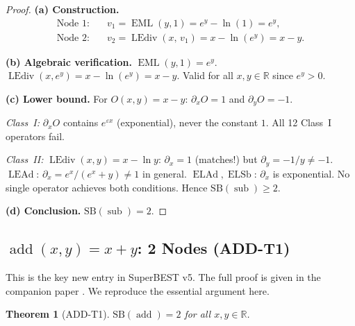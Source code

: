 \documentclass[12pt,a4paper]{article}
\newtheorem{theorem}{Theorem}[section]
\theoremstyle{definition}
\newcommand{\EML}{\operatorname{EML}}
\newcommand{\ELAd}{\operatorname{ELAd}}
\newcommand{\ELSb}{\operatorname{ELSb}}
\newcommand{\LEAd}{\operatorname{LEAd}}
\newcommand{\LEdiv}{\operatorname{LEdiv}}
\newcommand{\subop}{\operatorname{sub}}
\newcommand{\addop}{\operatorname{add}}
\newcommand{\SB}{\mathrm{SB}}
\newcommand{\R}{\mathbb{R}}
\begin{document}
\begin{proof}
\textbf{(a) Construction.}
\begin{align*}
  \text{Node 1:} &\quad v_1 = \EML(y,1) = e^y - \ln(1) = e^y, \\
  \text{Node 2:} &\quad v_2 = \LEdiv(x,\,v_1) = x - \ln(e^y) = x - y.
\end{align*}

\textbf{(b) Algebraic verification.}
$\EML(y,1) = e^y$.  $\LEdiv(x, e^y) = x - \ln(e^y) = x - y$.
Valid for all $x, y \in \R$ since $e^y > 0$.

\textbf{(c) Lower bound.}
For $O(x,y) = x-y$: $\partial_x O = 1$ and $\partial_y O = -1$.

\emph{Class~I:} $\partial_x O$ contains $e^{\varepsilon x}$ (exponential), never the
constant $1$.  All 12 Class~I operators fail.

\emph{Class~II:}
$\LEdiv(x,y) = x - \ln y$: $\partial_x = 1$ (matches!) but $\partial_y = -1/y \ne -1$.
$\LEAd$: $\partial_x = e^x/(e^x+y) \ne 1$ in general.
$\ELAd, \ELSb$: $\partial_x$ is exponential.
No single operator achieves both conditions.  Hence $\SB(\subop) \ge 2$.

\textbf{(d) Conclusion.} $\SB(\subop) = 2$.
\end{proof}

\subsection{\texorpdfstring{$\addop(x,y) = x+y$}{add(x,y)}: 2 Nodes (ADD-T1)}
\label{sec:add}

This is the key new entry in SuperBEST v5.  The full proof is given in the
companion paper \cite{ADDT1}.  We reproduce the essential argument here.

\begin{theorem}[ADD-T1]
\label{thm:add}
$\SB(\addop) = 2$ for all $x, y \in \R$.
\end{theorem}
\end{document}
